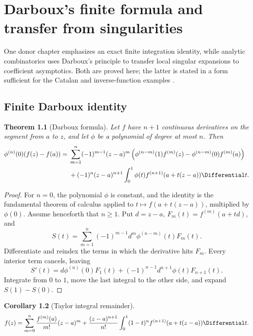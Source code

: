 \documentclass[11pt,a4paper,oneside,openany]{book}
\newtheorem{theorem}{Theorem}[chapter]
\newtheorem{corollary}[theorem]{Corollary}
\theoremstyle{definition}
\theoremstyle{remark}
\begin{document}
\chapter{Darboux's finite formula and transfer from singularities}
\label{ch:merged-darboux}

One donor chapter emphasizes an exact finite integration identity, while
analytic combinatorics uses Darboux's principle to transfer local singular
expansions to coefficient asymptotics.  Both are proved here; the latter is
stated in a form sufficient for the Catalan and inverse-function examples
\cite{FlajoletSedgewick2009}.

\section{Finite Darboux identity}

\begin{theorem}[Darboux formula]
\label{thm:merged-darboux-finite}
Let $f$ have $n+1$ continuous derivatives on the segment from $a$ to $z$, and
let $\phi$ be a polynomial of degree at most $n$.  Then
\begin{align}
 \phi^{(n)}(0)(f(z)-f(a))
={}&\sum_{m=1}^{n}(-1)^{m-1}(z-a)^m
 \left(\phi^{(n-m)}(1)f^{(m)}(z)
      -\phi^{(n-m)}(0)f^{(m)}(a)\right)                             \notag\\
 &+(-1)^n(z-a)^{n+1}\int_0^1\phi(t)
 f^{(n+1)}(a+t(z-a))\Differential t.                                         \label{eq:merged-darboux-finite}
\end{align}
\end{theorem}

\begin{proof}
For $n=0$, the polynomial $\phi$ is constant, and the identity is the
fundamental theorem of calculus applied to $t\mapsto f(a+t(z-a))$,
multiplied by $\phi(0)$.  Assume henceforth that $n\ge1$.
Put $d=z-a$, $F_m(t)=f^{(m)}(a+td)$, and
\[
 S(t)=\sum_{m=1}^{n}(-1)^{m-1}d^m\phi^{(n-m)}(t)F_m(t).
\]
Differentiate and reindex the terms in which the derivative hits $F_m$.
Every interior term cancels, leaving
\[
 S'(t)=d\phi^{(n)}(0)F_1(t)
       +(-1)^{n-1}d^{n+1}\phi(t)F_{n+1}(t).
\]
Integrate from $0$ to $1$, move the last integral to the other side, and
expand $S(1)-S(0)$.
\end{proof}

\begin{corollary}[Taylor integral remainder]
\begin{equation}
 f(z)=\sum_{m=0}^{n}\frac{f^{(m)}(a)}{m!}(z-a)^m
 +\frac{(z-a)^{n+1}}{n!}\int_0^1(1-t)^n
 f^{(n+1)}(a+t(z-a))\Differential t.                                        \label{eq:merged-taylor-remainder}
\end{equation}
\end{corollary}
\end{document}
